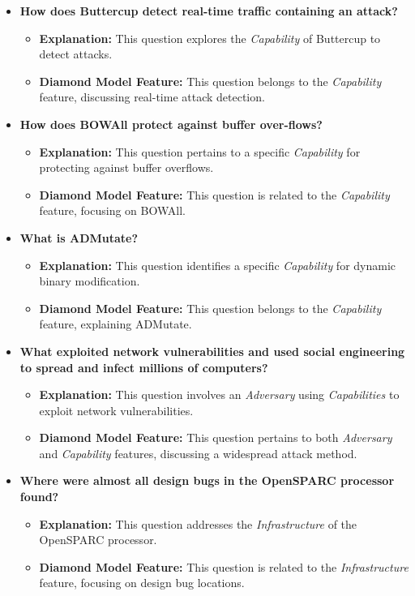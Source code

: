 \documentclass{article}
\begin{document}
\begin{itemize}
    \item \textbf{How does Buttercup detect real-time traffic containing an attack?}
    \begin{itemize}
        \item \textbf{Explanation:} This question explores the \textit{Capability} of Buttercup to detect attacks.
        \item \textbf{Diamond Model Feature:} This question belongs to the \textit{Capability} feature, discussing real-time attack detection.
    \end{itemize}

    \item \textbf{How does BOWAll protect against buffer over-flows?}
    \begin{itemize}
        \item \textbf{Explanation:} This question pertains to a specific \textit{Capability} for protecting against buffer overflows.
        \item \textbf{Diamond Model Feature:} This question is related to the \textit{Capability} feature, focusing on BOWAll.
    \end{itemize}

    \item \textbf{What is ADMutate?}
    \begin{itemize}
        \item \textbf{Explanation:} This question identifies a specific \textit{Capability} for dynamic binary modification.
        \item \textbf{Diamond Model Feature:} This question belongs to the \textit{Capability} feature, explaining ADMutate.
    \end{itemize}

    \item \textbf{What exploited network vulnerabilities and used social engineering to spread and infect millions of computers?}
    \begin{itemize}
        \item \textbf{Explanation:} This question involves an \textit{Adversary} using \textit{Capabilities} to exploit network vulnerabilities.
        \item \textbf{Diamond Model Feature:} This question pertains to both \textit{Adversary} and \textit{Capability} features, discussing a widespread attack method.
    \end{itemize}

    \item \textbf{Where were almost all design bugs in the OpenSPARC processor found?}
    \begin{itemize}
        \item \textbf{Explanation:} This question addresses the \textit{Infrastructure} of the OpenSPARC processor.
        \item \textbf{Diamond Model Feature:} This question is related to the \textit{Infrastructure} feature, focusing on design bug locations.
    \end{itemize}


\end{itemize}
\end{document}
